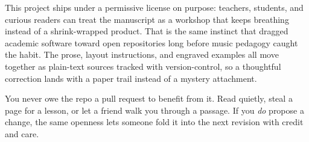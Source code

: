 \thispagestyle{empty}
\null
\vspace*{\fill}
\begin{flushleft}
\begin{minipage}{0.78\textwidth}
This project ships under a permissive license on purpose: teachers, students, and curious readers can treat the manuscript as a workshop that keeps breathing instead of a shrink-wrapped product. That is the same instinct that dragged academic software toward open repositories long before music pedagogy caught the habit. The prose, layout instructions, and engraved examples all move together as \gls{plain-text} sources tracked with \gls{version-control}, so a thoughtful correction lands with a paper trail instead of a mystery attachment.

You never owe the repo a pull request to benefit from it. Read quietly, steal a page for a lesson, or let a friend walk you through a passage. If you \emph{do} propose a change, the same openness lets someone fold it into the next revision with credit and care.
\end{minipage}
\end{flushleft}
\vspace*{\fill}
\clearpage
